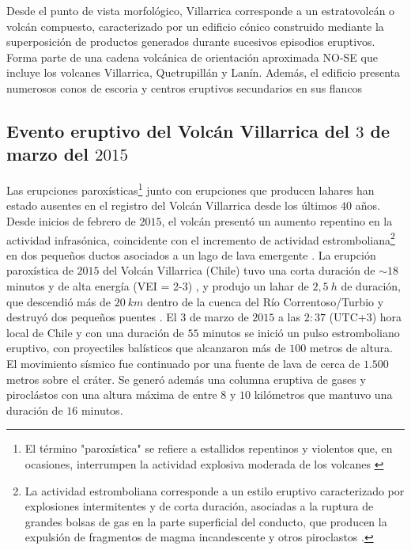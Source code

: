 Desde el punto de vista morfológico, Villarrica corresponde a un estratovolcán o volcán compuesto, caracterizado por un edificio cónico construido mediante la superposición de productos generados durante sucesivos episodios eruptivos. 
Forma parte de una cadena volcánica de orientación aproximada NO-SE que incluye los volcanes Villarrica, Quetrupillán y Lanín. Además, el edificio presenta numerosos conos de escoria y centros eruptivos secundarios en sus flancos

\subsection{Evento eruptivo del Volcán Villarrica del $3$ de marzo del $2015$}
Las erupciones paroxísticas\footnote{El término "paroxística" se refiere a  estallidos repentinos y violentos que, en ocasiones, interrumpen la actividad explosiva moderada de los volcanes \cite{caricchi2024co2}} 
junto con erupciones que producen lahares han estado ausentes en el registro del Volcán Villarrica desde los últimos $40$ años. Desde inicios de febrero de $2015$, el volcán presentó un aumento repentino en la actividad
infrasónica, coincidente con el incremento de actividad estromboliana\footnote{
La actividad estromboliana corresponde a un estilo eruptivo caracterizado por explosiones intermitentes y de corta duración, asociadas a la ruptura de grandes bolsas de gas en la parte
superficial del conducto, que producen la expulsión de fragmentos de magma incandescente y otros piroclastos \cite{gaudin2017puffing}.} en dos pequeños ductos asociados a un lago de lava emergente \cite{unknown}. La erupción paroxística de $2015$ del Volcán Villarrica (Chile) 
tuvo una corta duración de $\sim 18$ minutos y de alta energía (VEI = 2-3) \cite{inproceedings}, y  produjo un lahar de $2,5\ h$ de duración, que descendió más de $20\ km$ dentro de la cuenca del Río Correntoso/Turbio y destruyó dos pequeños puentes \cite{johnson2015lahar}.
El $3$ de marzo de $2015$ a las $2:37$ (UTC+3) hora local de Chile y con una duración de $55$ minutos se inició un pulso estromboliano eruptivo, con proyectiles balísticos que alcanzaron más de $100$ metros de altura. El movimiento sísmico
fue continuado por una fuente de lava de cerca de $1.500$ metros sobre el cráter. Se generó además una columna eruptiva de gases y piroclástos con una altura máxima de entre $8$ y $10$ kilómetros que mantuvo una duración de $16$ minutos. \cite{sernageomin2015informe, inproceedingsn}

